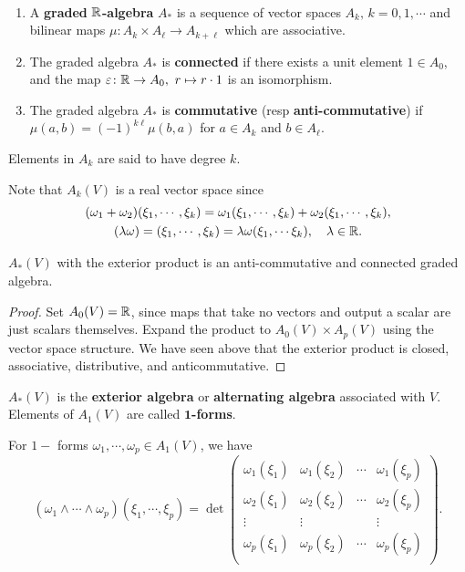 \begin{definition}[]
    \,
    \begin{enumerate}[label=(\roman*)]
        \item A \textbf{graded} $\mathbb{R}$\textbf{-algebra} $A_*$ is a sequence of vector spaces $A_k,\, k=0,1,\cdots $ and bilinear maps $\mu \colon A_k \times A_{\ell} \to A_{k+\ell}$ which are associative.
        \item The graded algebra $A_*$ is \textbf{connected} if there exists a unit element $1 \in A_0$, and the map $\varepsilon \colon \R \to A_0,\ r\mapsto r\cdot 1$ is an isomorphism.
        \item The graded algebra $A_*$ is \textbf{commutative} (resp \textbf{anti-commutative}) if $\mu(a,b)=(-1)^{k\ell}\mu(b,a)$ for $a \in A_k$ and $b \in A_{\ell}$.
    \end{enumerate}
    Elements in $A_k$ are said to have degree $k$.
\end{definition}
Note that $A_k(V)$ is a real vector space since 
\begin{gather*}
    (\omega_1+\omega_2)(\xi_1,\cdots ,\xi_k)=\omega_1(\xi_1,\cdots ,\xi_k)+\omega_2(\xi_1,\cdots ,\xi_k),\\
    (\lambda\omega)=(\xi_1,\cdots ,\xi_k)=\lambda\omega(\xi_1,\cdots \xi_k),\quad \lambda \in \mathbb{R}.
\end{gather*}
\begin{theorem}
    $A_*(V)$ with the exterior product is an anti-commutative and connected graded algebra.
\end{theorem}
\begin{proof}
    Set $A_0(V)=\mathbb{R}$, since maps that take no vectors and output a scalar are just scalars themselves. Expand the product to $A_0(V)\times A_p(V)$ using the vector space structure. We have seen above that the exterior product is closed, associative, distributive, and anticommutative.
\end{proof}
$A_*(V)$ is the \textbf{exterior algebra} or \textbf{alternating algebra} associated with $V$. Elements of $A_1(V)$ are called $\mathbf 1$\textbf{-forms}.
\begin{lemma}
    For $1-$ forms $\omega_1,\cdots ,\omega_p \in A_1(V)$, we have \[
        (\omega_1\wedge\cdots \wedge\omega_p)(\xi_1,\cdots ,\xi_p)=\det 
        \begin{pmatrix}
            \omega_1(\xi_1) & \omega_1(\xi_2) & \cdots  & \omega_1(\xi_p)\\
            \omega_2(\xi_1) & \omega_2(\xi_2) & \cdots  & \omega_2(\xi_p)\\
            \vdots & \vdots & & \vdots \\
            \omega_p(\xi_1) & \omega_p(\xi_2) & \cdots  & \omega_p(\xi_p)\\
        \end{pmatrix}.
    \] 
\end{lemma}
